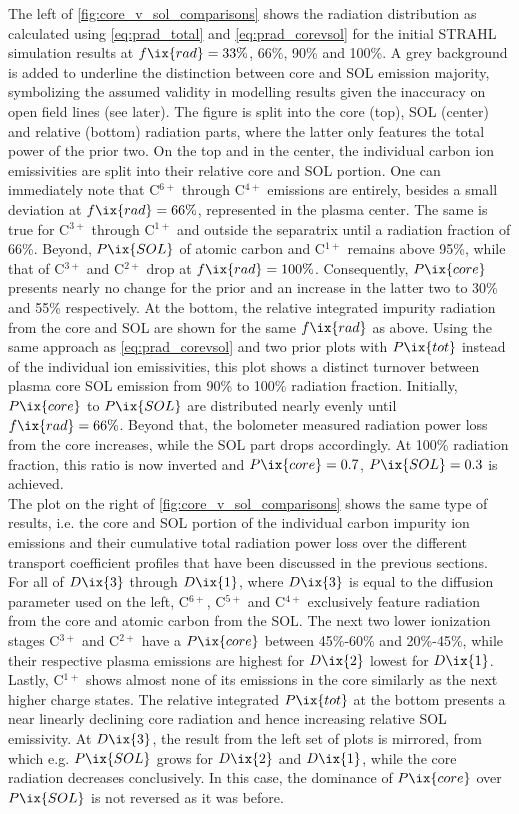             The left of \cref{fig:core_v_sol_comparisons} shows the radiation distribution as calculated using \cref{eq:prad_total} and \cref{eq:prad_corevsol} for the initial STRAHL simulation results at $f\ix{rad}=33\%$, 66\%, 90\% and 100\%. A grey background is added to underline the distinction between core and SOL emission majority, symbolizing the assumed validity in modelling results given the inaccuracy on open field lines (see later). The figure is split into the core (top), SOL (center) and relative (bottom) radiation parts, where the latter only features the total power of the prior two. On the top and in the center, the individual carbon ion emissivities are split into their relative core and SOL portion. One can immediately note that C$^{6+}$ through C$^{4+}$ emissions are entirely, besides a small deviation at $f\ix{rad}=66\%$, represented in the plasma center. The same is true for C$^{3+}$ through C$^{1+}$ and outside the separatrix until a radiation fraction of 66\%. Beyond, $P\ix{SOL}$ of atomic carbon and C$^{1+}$ remains above 95\%, while that of C$^{3+}$ and C$^{2+}$ drop at $f\ix{rad}=100\%$. Consequently, $P\ix{core}$ presents nearly no change for the prior and an increase in the latter two to 30\% and 55\% respectively. At the bottom, the relative integrated impurity radiation from the core and SOL are shown for the same $f\ix{rad}$ as above. Using the same approach as \cref{eq:prad_corevsol} and two prior plots with $P\ix{tot}$ instead of the individual ion emissivities, this plot shows a distinct turnover between plasma core SOL emission from 90\% to 100\% radiation fraction. Initially, $P\ix{core}$ to $P\ix{SOL}$ are distributed nearly evenly until $f\ix{rad}=66\%$. Beyond that, the bolometer measured radiation power loss from the core increases, while the SOL part drops accordingly. At 100\% radiation fraction, this ratio is now inverted and $P\ix{core}=0.7$, $P\ix{SOL}=0.3$ is achieved.\\%
            The plot on the right of \cref{fig:core_v_sol_comparisons} shows the same type of results, i.e. the core and SOL portion of the individual carbon impurity ion emissions and their cumulative total radiation power loss over the different transport coefficient profiles that have been discussed in the previous sections. For all of $D\ix{3}$ through $D\ix{1}$, where $D\ix{3}$ is equal to the diffusion parameter used on the left, C$^{6+}$, C$^{5+}$ and C$^{4+}$ exclusively feature radiation from the core and atomic carbon from the SOL. The next two lower ionization stages C$^{3+}$ and C$^{2+}$ have a $P\ix{core}$ between 45\%-60\% and 20\%-45\%, while their respective plasma emissions are highest for $D\ix{2}$ lowest for $D\ix{1}$. Lastly, C$^{1+}$ shows almost none of its emissions in the core similarly as the next higher charge states. The relative integrated $P\ix{tot}$ at the bottom presents a near linearly declining core radiation and hence increasing relative SOL emissivity. At $D\ix{3}$, the result from the left set of plots is mirrored, from which e.g. $P\ix{SOL}$ grows for $D\ix{2}$ and $D\ix{1}$, while the core radiation decreases conclusively. In this case, the dominance of $P\ix{core}$ over $P\ix{SOL}$ is not reversed as it was before.\\%
